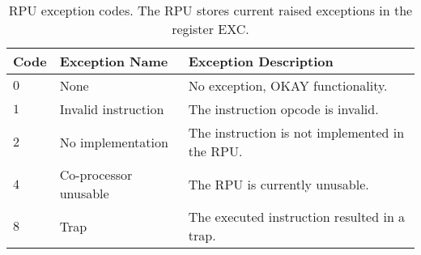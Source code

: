 \documentclass[11pt]{article}
\begin{document}
\begin{table}[htbp] \begin{center}
  \caption{RPU exception codes. The RPU stores current raised exceptions in the register EXC.}
  \label{tab:rpu_exception_codes}
  \begin{tabular}{|m{1.5cm}|m{3.5cm}|m{7cm}|}
    \hline
    \textbf{Code} & \textbf{Exception Name} & \textbf{Exception Description}\\ \hline

    $0$ & None & No exception, OKAY functionality.\\ \hline

    $1$ & Invalid instruction & The instruction opcode is invalid.\\ \hline

    $2$ & No implementation & The instruction is not implemented in the RPU.\\ \hline

    $4$ & Co-processor unusable & The RPU is currently unusable.\\ \hline

    $8$ & Trap & The executed instruction resulted in a trap.\\ \hline
  \end{tabular}
\end{center}
\end{table}
\end{document}
